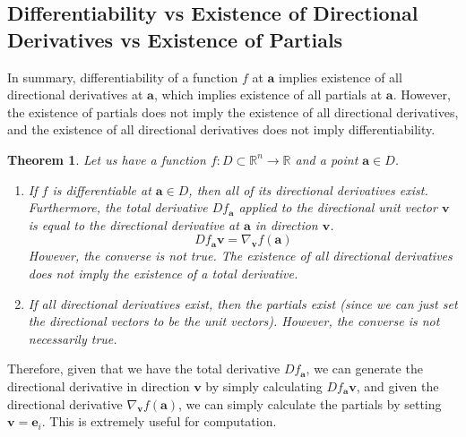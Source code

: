 \documentclass{article}
\newtheorem{theorem}{Theorem}[section]
\theoremstyle{remark}
\theoremstyle{definition}
\begin{document}
\subsection{Differentiability vs Existence of Directional Derivatives vs Existence of Partials}

In summary, differentiability of a function $f$ at $\mathbf{a}$ implies existence of all directional derivatives at $\mathbf{a}$, which implies existence of all partials at $\mathbf{a}$. However, the existence of partials does not imply the existence of all directional derivatives, and the existence of all directional derivatives does not imply differentiability. 

\begin{theorem}
Let us have a function $f: D \subset \mathbb{R}^n \longrightarrow \mathbb{R}$ and a point $\mathbf{a} \in D$. 
\begin{enumerate}
    \item If $f$ is differentiable at $\mathbf{a} \in D$, then all of its directional derivatives exist. Furthermore, the total derivative $D f_\mathbf{a}$ applied to the directional unit vector $\mathbf{v}$ is equal to the directional derivative at $\mathbf{a}$ in direction $\mathbf{v}$. 
    \[D f_\mathbf{a} \mathbf{v} = \nabla_\mathbf{v} f (\mathbf{a})\]
    However, the converse is not true. The existence of all directional derivatives does not imply the existence of a total derivative. 
    \item If all directional derivatives exist, then the partials exist (since we can just set the directional vectors to be the unit vectors). However, the converse is not necessarily true. 
\end{enumerate}
\end{theorem} 

Therefore, given that we have the total derivative $D f_\mathbf{a}$, we can generate the directional derivative in direction $\mathbf{v}$ by simply calculating $D f_\mathbf{a} \mathbf{v}$, and given the directional derivative $\nabla_\mathbf{v} f(\mathbf{a})$, we can simply calculate the partials by setting $\mathbf{v} = \mathbf{e}_i$. This is extremely useful for computation. 
\end{document}
